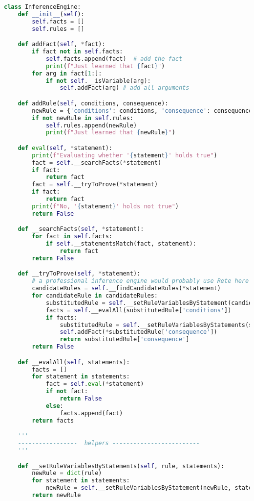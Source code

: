 \begin{lstlisting}[language=python]
class InferenceEngine:
    def __init__(self):
        self.facts = []
        self.rules = []

    def addFact(self, *fact):
        if fact not in self.facts:
            self.facts.append(fact)  # add the fact
            print(f"Just learned that {fact}")
        for arg in fact[1:]:
            if not self.__isVariable(arg):
                self.addFact(arg) # add all arguments

    def addRule(self, conditions, consequence):
        newRule = {'conditions': conditions, 'consequence': consequence}
        if not newRule in self.rules:
            self.rules.append(newRule)
            print(f"Just learned that {newRule}")

    def eval(self, *statement):
        print(f"Evaluating whether '{statement}' holds true")
        fact = self.__searchFacts(*statement)
        if fact:
            return fact
        fact = self.__tryToProve(*statement)
        if fact:
            return fact
        print(f"No, '{statement}' holds not true")
        return False

    def __searchFacts(self, *statement):
        for fact in self.facts:
            if self.__statementsMatch(fact, statement):
                return fact
        return False

    def __tryToProve(self, *statement):
        # a professional inference engine would probably use Rete here
        candidateRules = self.__findCandidateRules(*statement)
        for candidateRule in candidateRules:
            substitutedRule = self.__setRuleVariablesByStatement(candidateRule, statement)
            facts = self.__evalAll(substitutedRule['conditions'])
            if facts:
                substitutedRule = self.__setRuleVariablesByStatements(substitutedRule, facts)
                self.addFact(*substitutedRule['consequence'])
                return substitutedRule['consequence']
        return False

    def __evalAll(self, statements):
        facts = []
        for statement in statements:
            fact = self.eval(*statement)
            if not fact:
                return False
            else:
                facts.append(fact)
        return facts

    '''
    -----------------  helpers -------------------------
    '''

    def __setRuleVariablesByStatements(self, rule, statements):
        newRule = dict(rule)
        for statement in statements:
            newRule = self.__setRuleVariablesByStatement(newRule, statement)
        return newRule


\end{lstlisting}
